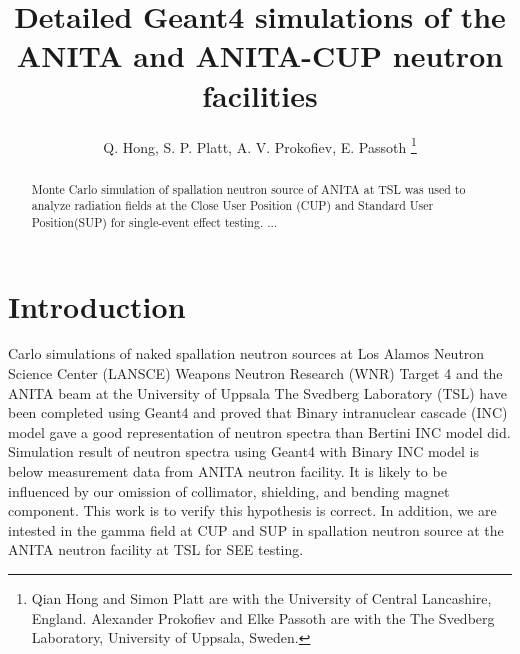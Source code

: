 \documentclass[11pt,a4paper]{IEEEtran}
\begin{document}
\title{
    Detailed Geant4 simulations of the ANITA and ANITA-CUP neutron facilities
}

\author{%
    Q. Hong,
    S. P. Platt,
    A. V. Prokofiev,
    E. Passoth
    \thanks{%
        Qian Hong and Simon Platt are with the University of Central Lancashire, England. Alexander Prokofiev and Elke Passoth are with the The Svedberg Laboratory, University of Uppsala, Sweden.
    }
}

\maketitle

\begin{abstract}
    Monte Carlo simulation of spallation neutron source of ANITA at TSL was used to analyze radiation fields at the Close User Position (CUP) and Standard User Position(SUP) for single-event effect testing. ...
\end{abstract}

\section{Introduction}
 Carlo simulations of naked spallation neutron sources at Los Alamos Neutron Science Center (LANSCE) Weapons Neutron Research (WNR) Target 4\cite{Wender87} and the ANITA beam at the University of Uppsala The Svedberg Laboratory (TSL) have been completed using Geant4 and proved that Binary intranuclear cascade (INC) model gave a good representation of neutron spectra than Bertini INC model did\cite{Platt2013}. Simulation result of neutron spectra using Geant4 with Binary INC model is below measurement data from ANITA neutron facility. It is likely to be influenced by our omission of collimator, shielding, and bending magnet component. This work is to verify this hypothesis is correct. In addition, we are intested in the gamma field at CUP and SUP in spallation neutron source at the ANITA neutron facility at TSL for SEE testing.
\end{document}

